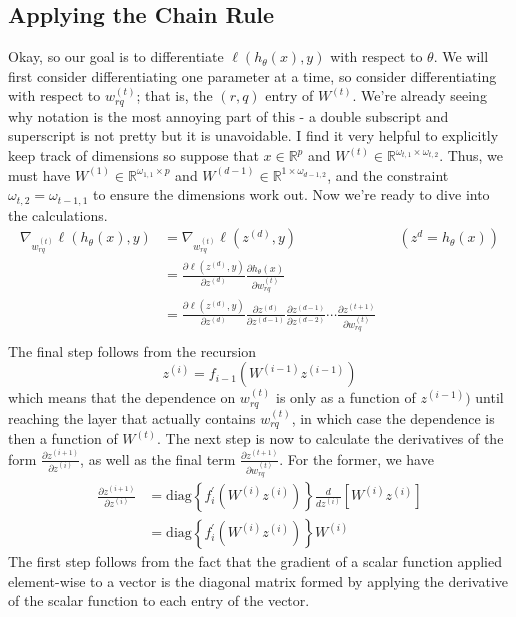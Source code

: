 \documentclass[12pt]{article}
\newcommand{\R}{\mathcal{R}}
\def\R{\mathbb{R}}
\begin{document}
\subsection{Applying the Chain Rule}
Okay, so our goal is to differentiate $\ell(h_\theta(x), y)$ with respect to $\theta$. We will first consider differentiating one parameter at a time, so consider differentiating with 
respect to $w^{(t)}_{rq}$; that is, the $(r, q)$ entry of $W^{(t)}$. We're already seeing why notation is the most annoying part of this - a double subscript and superscript is not pretty 
but it is unavoidable. I find it very helpful to explicitly keep track of dimensions so suppose that $x \in \R^p$ and $W^{(t)} \in \R^{\omega_{t, 1} \times \omega_{t, 2}}$. Thus, we must have 
$W^{(1)} \in \R^{\omega_{1, 1} \times p}$ and $W^{(d - 1)} \in \R^{1 \times \omega_{d-1, 2}}$, and the constraint $\omega_{t, 2} = \omega_{t - 1, 1}$ to ensure the dimensions work out. 
Now we're ready to dive into the calculations. 
\begin{align*}
\nabla_{w_{rq}^{(t)}} \ell(h_\theta(x), y) &= \nabla_{w_{rq}^{(t)}} \ell(z^{(d)}, y) && \left(z^{d} = h_\theta(x) \right) \\ 
							   &= \frac{\partial \ell(z^{(d)}, y)}{\partial z^{(d)}} \frac{\partial h_\theta(x)}{\partial w_{rq}^{(t)}} \\
							   &= \frac{\partial \ell(z^{(d)}, y)}{\partial z^{(d)}} \frac{\partial z^{(d)}}{\partial z^{(d - 1)}} \frac{\partial z^{(d - 1)}}{\partial z^{(d - 2)}} \cdots \frac{\partial z^{(t + 1)}}{\partial w_{rq}^{(t)}}\\
\end{align*}
The final step follows from the recursion
\[z^{(i)} = f_{i - 1}(W^{(i - 1)}z^{(i - 1)})\]
which means that the dependence on $w^{(t)}_{rq}$ is only as a function of $z^{(i - 1)})$ until reaching the layer that actually contains $w^{(t)}_{rq}$, in which case the dependence is 
then a function of $W^{(t)}$. The next step is now to calculate the derivatives of the form $\frac{\partial z^{(i + 1)}}{\partial z^{(i)}}$, as well as the final term $\frac{\partial z^{(t + 1)}}{\partial w_{rq}^{(t)}}$. 
For the former, we have 
\begin{align*}
\frac{\partial z^{(i + 1)}}{\partial z^{(i)}} &= \text{diag}\left\{f_{i}^\prime(W^{(i)}z^{(i)})\right\} \frac{d}{dz^{(i)}} \left[W^{(i)} z^{(i)} \right]\\
							 &= \text{diag}\left\{f_{i}^\prime(W^{(i)}z^{(i)})\right\} W^{(i)}
\end{align*}
The first step follows from the fact that the gradient of a scalar function applied element-wise to a vector is the diagonal matrix formed by applying 
the derivative of the scalar function to each entry of the vector.
\end{document}
